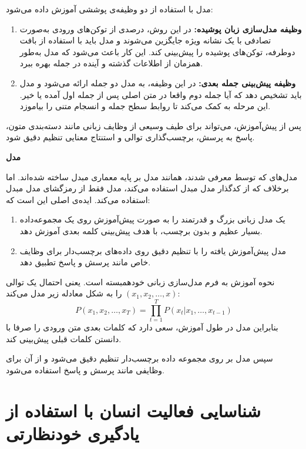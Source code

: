 مدل  با استفاده از دو وظیفه‌ی پوششی آموزش داده می‌شود:
\begin{enumerate}
    \item \textbf{وظیفه مدل‌سازی زبان پوشیده:}
    در این روش، درصدی از توکن‌های ورودی به‌صورت تصادفی با یک نشانه ویژه جایگزین می‌شوند و مدل باید با استفاده از بافت دوطرفه، توکن‌های پوشیده را پیش‌بینی کند. این کار باعث می‌شود که مدل به‌طور همزمان از اطلاعات گذشته و آینده در جمله بهره ببرد.
    \item \textbf{وظیفه پیش‌بینی جمله بعدی:}
    در این وظیفه، به مدل دو جمله ارائه می‌شود و مدل باید تشخیص دهد که آیا جمله دوم واقعا در متن اصلی پس از جمله اول آمده یا خیر. این مرحله به  کمک می‌کند تا روابط سطح جمله و انسجام متنی را بیاموزد.
\end{enumerate}
پس از پیش‌آموزش،  می‌تواند برای طیف وسیعی از وظایف زبانی مانند دسته‌بندی متون، پاسخ به پرسش، برچسب‌گذاری توالی و استنتاج معنایی تنظیم دقیق شود.\newline

\noindent\textbf{مدل }

مدل‌های \cite{radford2019language} که توسط  معرفی شدند، همانند مدل 
بر پایه معماری مبدل ساخته شده‌اند. اما برخلاف 
که از کدگذار مدل مبدل استفاده می‌کند، مدل 
فقط از رمزگشای مدل مبدل استفاده می‌کند. ایده‌ی اصلی 
این است که:
\begin{enumerate}
    \item یک مدل زبانی بزرگ و قدرتمند را به صورت پیش‌آموزش روی یک مجموعه‌داده بسیار عظیم و بدون برچسب، با هدف پیش‌بینی کلمه بعدی آموزش دهد.
    \item مدل پیش‌آموزش یافته را با تنظیم دقیق روی داده‌های برچسب‌دار برای وظایف خاص مانند پرسش و پاسخ تطبیق دهد.
\end{enumerate}
نحوه آموزش  به فرم مدل‌سازی زبانی خودهمبسته است. یعنی احتمال یک توالی
$(x_1, x_2, \dots, x)$
را به شکل معادله زیر مدل می‌کند:
\begin{equation}
P(x_1, x_2, \dots, x_T) = \prod_{t=1}^{T} P(x_t | x_1, \dots, x_{t-1})
\end{equation}
بنابراین مدل در طول آموزش، سعی دارد که کلمات بعدی متن ورودی را صرفا با دانستن کلمات قبلی پیش‌بینی کند.

سپس مدل بر روی مجموعه داده برچسب‌دار تنظیم دقیق می‌شود و از آن برای وظایفی مانند پرسش و پاسخ استفاده می‌شود.

\section{شناسایی فعالیت انسان با استفاده از یادگیری خودنظارتی}

